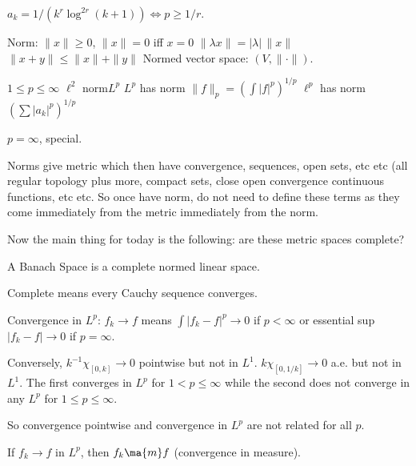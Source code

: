 $a_k= 1/(k^r \log^{2r}(k+1)) \iff p \geq 1/r$. 



Norm: $\|x\| \geq 0$, $\|x\|=0$ iff $x=0$
$\| \lambda x\|= |\lambda| \, \|x\|$
$\|x+y\| \leq \|x\|+\|y\|$
Normed vector space: $(V, \|\cdot\|)$. 

$1 \leq p \leq \infty$
$\ell^2$ norm$L^p$ 
$L^p$ has norm $\|f\|_p= \left(\int |f|^p \right)^{1/p}$
$\ell^p$ has norm $\left( \sum |a_k|^p \right)^{1/p}$

$p=\infty$, special.


Norms give metric which then have convergence, sequences, open sets, etc etc (all regular topology plus more, compact sets, close open convergence continuous functions, etc etc. So once have norm, do not need to define these terms as they come immediately from the metric immediately from the norm. 

Now the main thing for today is the following: are these metric spaces complete?

\begin{dfn}
A Banach Space is a complete normed linear space.
\end{dfn}

Complete means every Cauchy sequence converges. 



Convergence in $L^p$: $f_k \to f$ means $\int |f_k-f|^p \to 0$ if $p<\infty$ or essential sup $|f_k-f| \to 0$ if $p= \infty$. 


\begin{ex}
%
Conversely, $k^{-1} \chi_{[0,k]} \to 0$ pointwise but not in $L^1$. $k \chi_{[0,1/k]} \to 0$ a.e. but not in $L^1$. The first converges in $L^p$ for $1<p \leq \infty$ while the second does not converge in any $L^p$ for $1 \leq p \leq \infty$. 

\end{ex}

So convergence pointwise and convergence in $L^p$ are not related for all $p$.


\begin{lem}
If $f_k \to f$ in $L^p$, then $f_k \ma{m} f$ (convergence in measure). 
\end{lem}

